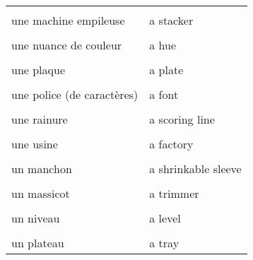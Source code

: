 \documentclass[
  10pt,
]{article}
\begin{document}
\begin{longtable}{ll}
\cellcolor{gray!6}{une livraison} & \cellcolor{gray!6}{a delivery}\\

une machine empileuse & a stacker\\

\cellcolor{gray!6}{un entrepôt} & \cellcolor{gray!6}{a warehouse}\\

une nuance de couleur & a hue\\

\cellcolor{gray!6}{une page} & \cellcolor{gray!6}{a sheet}\\

une plaque & a plate\\

\cellcolor{gray!6}{une poignée} & \cellcolor{gray!6}{a handle}\\

une police (de caractères) & a font\\

\cellcolor{gray!6}{un équilibre} & \cellcolor{gray!6}{a balance}\\

une rainure & a scoring line\\

\cellcolor{gray!6}{une récompense, un prix} & \cellcolor{gray!6}{a prize}\\

une usine & a factory\\

\cellcolor{gray!6}{un logiciel} & \cellcolor{gray!6}{a software}\\

un manchon & a shrinkable sleeve\\

\cellcolor{gray!6}{ \vphantom{2}& }\\

\multirow[t]{-2}{*}{\raggedright\arraybackslash un massicot} & \multirow[t]{-2}{*}{\raggedright\arraybackslash a trimmer}\\

\cellcolor{gray!6}{un métier, commerce} & \cellcolor{gray!6}{a trade}\\

un niveau & a level\\

\cellcolor{gray!6}{un nuancier} & \cellcolor{gray!6}{a fan deck}\\

un plateau & a tray\\


\end{longtable}
\end{document}
